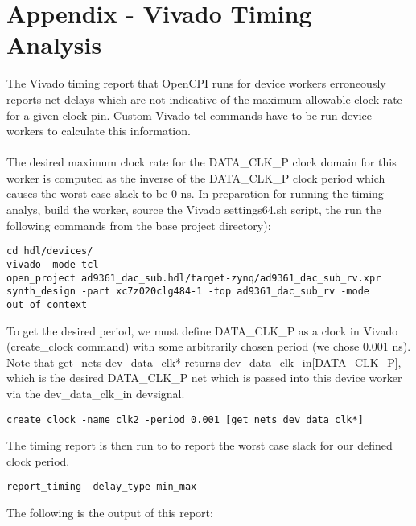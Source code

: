 \documentclass{article}
\begin{document}
\section{Appendix - Vivado Timing Analysis} \label{appendix}
The Vivado timing report that OpenCPI runs for device workers erroneously reports net delays which are not indicative of the maximum allowable clock rate for a given clock pin. Custom Vivado tcl commands have to be run device workers to calculate this information. \\ \\
The desired maximum clock rate for the DATA\_CLK\_P clock domain for this worker is computed as the inverse of the DATA\_CLK\_P clock period which causes the worst case slack to be 0 ns. In preparation for running the timing analys, build the worker, source the Vivado settings64.sh script, the run the following commands from the base project directory):
\lstset{language=bash, columns=flexible, breaklines=true, prebreak=\textbackslash, basicstyle=\ttfamily, showstringspaces=false,upquote=true, aboveskip=\baselineskip, belowskip=\baselineskip, upquote=true}
\begin{lstlisting}
cd hdl/devices/
vivado -mode tcl
open_project ad9361_dac_sub.hdl/target-zynq/ad9361_dac_sub_rv.xpr
synth_design -part xc7z020clg484-1 -top ad9361_dac_sub_rv -mode out_of_context
\end{lstlisting}
To get the desired period, we must define DATA\_CLK\_P as a clock in Vivado (create\_clock command) with some arbitrarily chosen period (we chose 0.001 ns). Note that get\_nets dev\_data\_clk* returns dev\_data\_clk\_in[DATA\_CLK\_P], which is the desired DATA\_CLK\_P net which is passed into this device worker via the dev\_data\_clk\_in devsignal.
\begin{lstlisting}
create_clock -name clk2 -period 0.001 [get_nets dev_data_clk*]
\end{lstlisting}
The timing report is then run to to report the worst case slack for our defined clock period.
\begin{lstlisting}
report_timing -delay_type min_max
\end{lstlisting}
The following is the output of this report:
\fontsize{6}{12}\selectfont
\end{document}
